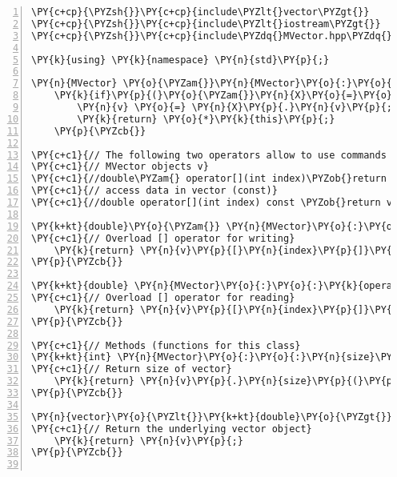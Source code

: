 \begin{Verbatim}[tabsize=2,commandchars=\\\{\},numbers=left,firstnumber=1,stepnumber=1]
\PY{c+cp}{\PYZsh{}}\PY{c+cp}{include\PYZlt{}vector\PYZgt{}}
\PY{c+cp}{\PYZsh{}}\PY{c+cp}{include\PYZlt{}iostream\PYZgt{}}
\PY{c+cp}{\PYZsh{}}\PY{c+cp}{include\PYZdq{}MVector.hpp\PYZdq{}}

\PY{k}{using} \PY{k}{namespace} \PY{n}{std}\PY{p}{;}

\PY{n}{MVector} \PY{o}{\PYZam{}}\PY{n}{MVector}\PY{o}{:}\PY{o}{:}\PY{k}{operator}\PY{o}{=}\PY{p}{(}\PY{k}{const} \PY{n}{MVector}\PY{o}{\PYZam{}} \PY{n}{X}\PY{p}{)} \PY{p}{\PYZob{}}
	\PY{k}{if}\PY{p}{(}\PY{o}{\PYZam{}}\PY{n}{X}\PY{o}{=}\PY{o}{=}\PY{k}{this}\PY{p}{)} \PY{k}{return} \PY{o}{*}\PY{k}{this}\PY{p}{;}
		\PY{n}{v} \PY{o}{=} \PY{n}{X}\PY{p}{.}\PY{n}{v}\PY{p}{;}
		\PY{k}{return} \PY{o}{*}\PY{k}{this}\PY{p}{;}
	\PY{p}{\PYZcb{}}

\PY{c+c1}{// The following two operators allow to use commands such as a=v[i] or v[j]=b for}
\PY{c+c1}{// MVector objects v}
\PY{c+c1}{//double\PYZam{} operator[](int index)\PYZob{}return v[index];\PYZcb{}}
\PY{c+c1}{// access data in vector (const)}
\PY{c+c1}{//double operator[](int index) const \PYZob{}return v[index];\PYZcb{}}

\PY{k+kt}{double}\PY{o}{\PYZam{}} \PY{n}{MVector}\PY{o}{:}\PY{o}{:}\PY{k}{operator}\PY{p}{[}\PY{p}{]}\PY{p}{(}\PY{k+kt}{int} \PY{n}{index}\PY{p}{)} \PY{p}{\PYZob{}}
\PY{c+c1}{// Overload [] operator for writing}
	\PY{k}{return} \PY{n}{v}\PY{p}{[}\PY{n}{index}\PY{p}{]}\PY{p}{;}
\PY{p}{\PYZcb{}}

\PY{k+kt}{double} \PY{n}{MVector}\PY{o}{:}\PY{o}{:}\PY{k}{operator}\PY{p}{[}\PY{p}{]}\PY{p}{(}\PY{k+kt}{int} \PY{n}{index}\PY{p}{)} \PY{k}{const} \PY{p}{\PYZob{}}
\PY{c+c1}{// Overload [] operator for reading}
	\PY{k}{return} \PY{n}{v}\PY{p}{[}\PY{n}{index}\PY{p}{]}\PY{p}{;}
\PY{p}{\PYZcb{}}

\PY{c+c1}{// Methods (functions for this class}
\PY{k+kt}{int} \PY{n}{MVector}\PY{o}{:}\PY{o}{:}\PY{n}{size}\PY{p}{(}\PY{p}{)} \PY{k}{const} \PY{p}{\PYZob{}}
\PY{c+c1}{// Return size of vector}
	\PY{k}{return} \PY{n}{v}\PY{p}{.}\PY{n}{size}\PY{p}{(}\PY{p}{)}\PY{p}{;}
\PY{p}{\PYZcb{}}

\PY{n}{vector}\PY{o}{\PYZlt{}}\PY{k+kt}{double}\PY{o}{\PYZgt{}} \PY{n}{MVector}\PY{o}{:}\PY{o}{:}\PY{n}{getVector}\PY{p}{(}\PY{p}{)} \PY{p}{\PYZob{}}
\PY{c+c1}{// Return the underlying vector object}
	\PY{k}{return} \PY{n}{v}\PY{p}{;}
\PY{p}{\PYZcb{}}


\end{Verbatim}
